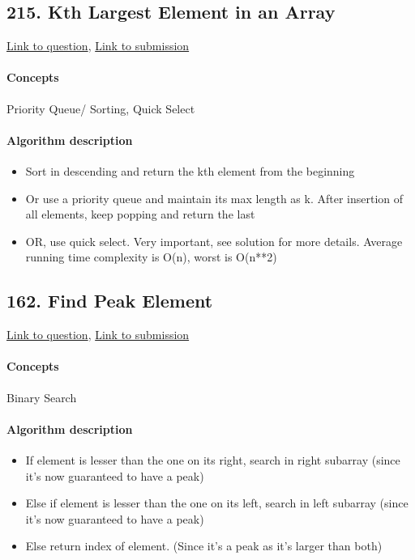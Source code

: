 \documentclass[11pt]{book}
\begin{document}
\subsection{215. Kth Largest Element in an Array}
\href{https://leetcode.com/problems/kth-largest-element-in-an-array/}{Link to question},
\href{https://leetcode.com/submissions/detail/339856317/}{Link to submission}
\paragraph{Concepts}
Priority Queue/ Sorting, Quick Select
\paragraph{Algorithm description}
\begin{itemize}
    \item Sort in descending and return the kth element from the beginning
    \item Or use a priority queue and maintain its max length as k. After insertion of all elements, keep popping and return the last
    \item OR, use quick select. Very important, see solution for more details. Average running time complexity is O(n), worst is O(n**2)
\end{itemize}

\subsection{162. Find Peak Element}
\href{https://leetcode.com/problems/find-peak-element/}{Link to question},
\href{https://leetcode.com/submissions/detail/339879552/}{Link to submission}
\paragraph{Concepts}
Binary Search
\paragraph{Algorithm description}
\begin{itemize}
    \item If element is lesser than the one on its right, search in right subarray (since it's now guaranteed to have a peak)
    \item Else if element is lesser than the one on its left, search in left subarray (since it's now guaranteed to have a peak)
    \item Else return index of element. (Since it's a peak as it's larger than both)
\end{itemize}


\end{document}
